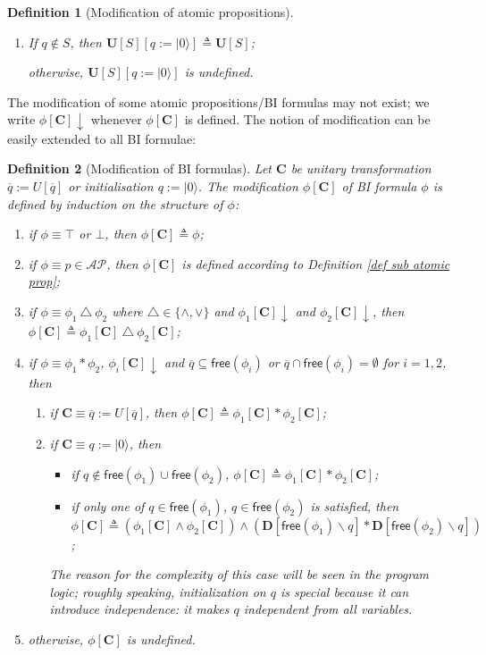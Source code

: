 \documentclass[conference,compsoc, 10pt]{IEEEtran}
\newtheorem{definition}{Definition}[section]
\newcommand {\qbar} {{\overline{q}}}
\newcommand {\qI} {{q:=|0\rangle}}
\newcommand {\qU} {{\overline{q}:=U[\overline{q}]}}
\newcommand {\bD} {{\mathbf{D}}}
\newcommand{\Mexist}{{\downarrow}}
\newcommand {\free }[1] {{\mathsf{free}\left(#1\right)}}
\newcommand {\unia } {{\mathbf{U}}}
\newcommand {\prog } {{\mathbf{C}}}
\newcommand {\AP} {{\mathcal{AP}}}
\begin{document}
\begin{definition}[Modification of atomic propositions]
\begin{enumerate}
\begin{enumerate}
				otherwise, $\unia[S][\qU]$ is undefined;
				\item If $q\notin S$, then $\unia[S][\qI] \triangleq\unia[S]$; 
				
				otherwise, $\unia[S][\qI]$ is undefined.
			\end{enumerate}
		\end{enumerate}
	\end{definition}
	
	The modification of some atomic propositions/BI formulas may not exist;
	we write $\phi[\prog]\Mexist$ whenever $\phi[\prog]$ is defined.	
	The notion of modification can be easily extended to all BI formulae: 
	\begin{definition}[Modification of BI formulas]
		\label{def sub 2-BI form} 
		Let $\prog$ be unitary transformation $\qU$ or initialisation $\qI$. The modification $\phi[\prog]$ of BI formula $\phi$ is defined by induction on the structure of $\phi$:
		\begin{enumerate}
			\item if $\phi\equiv \top$ or $\bot$, then $\phi[\prog] \triangleq \phi$;
			\item if $\phi\equiv p\in\AP$, then $\phi[\prog]$ is defined according to Definition \ref{def sub atomic prop};
			\item if $\phi\equiv \phi_1\ \triangle\ \phi_2$ where $\triangle\in\{ \wedge,\vee\}$ and $\phi_1[\prog]\Mexist$ and $\phi_2[\prog]\Mexist$, then $\phi[\prog]\triangleq\phi_1[\prog] \ \triangle\ \phi_2[\prog]$;
			\item if $\phi\equiv \phi_1\ast\phi_2$, $\phi_i[\prog]\Mexist$ and $\qbar\subseteq\free{\phi_i}$ or $\qbar\cap\free{\phi_i}=\emptyset$ for $i=1,2$, then
			\begin{enumerate}
				\item if $\prog\equiv\qU$, then $\phi[\prog]\triangleq\phi_1[\prog] \ast \phi_2[\prog]$;
				\item if $\prog\equiv\qI$, then
				\begin{itemize}
					\item if $q\notin\free{\phi_1}\cup\free{\phi_2}$, $\phi[\prog]\triangleq\phi_1[\prog]\ast \phi_2[\prog]$;
					\item if only one of $q\in\free{\phi_1}$, $q\in\free{\phi_2}$ is
            satisfied,
            then $\phi[\prog]\triangleq(\phi_1[\prog] \wedge \phi_2[\prog])\wedge(\bD[\free{\phi_1}\backslash
            q]\ast\bD[\free{\phi_2}\backslash q])$;
				\end{itemize}
        The reason for the complexity of this case will be seen in the program
        logic; roughly speaking, initialization on $q$ is special because it can
        introduce independence: it makes $q$ independent from all variables.
			\end{enumerate}
            \item otherwise, $\phi[\prog]$ is undefined.
		\end{enumerate}
	\end{definition}
\end{document}
